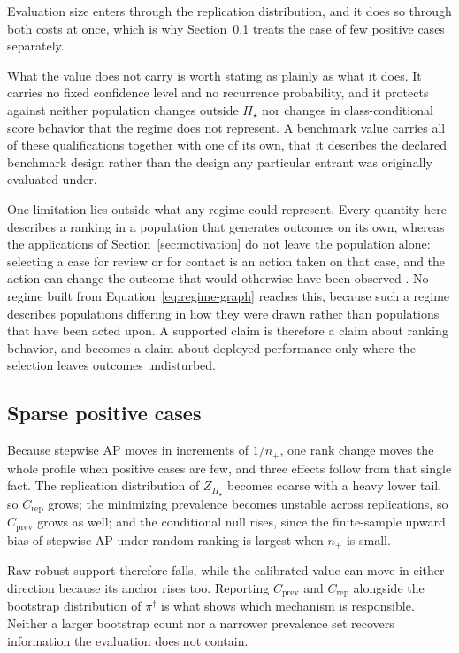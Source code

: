 \documentclass[11pt]{article}
\newcommand{\PSet}{\Pi_\star}
\theoremstyle{remark}
\begin{document}
Evaluation size enters through the replication distribution, and it does so through both costs at once, which is why Section~\ref{sec:sparse} treats the case of few positive cases separately.

What the value does not carry is worth stating as plainly as what it does. It carries no fixed confidence level and no recurrence probability, and it protects against neither population changes outside $\PSet$ nor changes in class-conditional score behavior that the regime does not represent. A benchmark value carries all of these qualifications together with one of its own, that it describes the declared benchmark design rather than the design any particular entrant was originally evaluated under.

One limitation lies outside what any regime could represent. Every quantity here describes a ranking in a population that generates outcomes on its own, whereas the applications of Section~\ref{sec:motivation} do not leave the population alone: selecting a case for review or for contact is an action taken on that case, and the action can change the outcome that would otherwise have been observed \cite{perdomo2020performative}. No regime built from Equation~\eqref{eq:regime-graph} reaches this, because such a regime describes populations differing in how they were drawn rather than populations that have been acted upon. A supported claim is therefore a claim about ranking behavior, and becomes a claim about deployed performance only where the selection leaves outcomes undisturbed.

\subsection{Sparse positive cases}
\label{sec:sparse}

Because stepwise AP moves in increments of $1/n_+$, one rank change moves the whole profile when positive cases are few, and three effects follow from that single fact. The replication distribution of $Z_{\PSet}$ becomes coarse with a heavy lower tail, so $C_{\mathrm{rep}}$ grows; the minimizing prevalence becomes unstable across replications, so $C_{\mathrm{prev}}$ grows as well; and the conditional null rises, since the finite-sample upward bias of stepwise AP under random ranking is largest when $n_+$ is small.

Raw robust support therefore falls, while the calibrated value can move in either direction because its anchor rises too. Reporting $C_{\mathrm{prev}}$ and $C_{\mathrm{rep}}$ alongside the bootstrap distribution of $\pi^\dagger$ is what shows which mechanism is responsible. Neither a larger bootstrap count nor a narrower prevalence set recovers information the evaluation does not contain.
\end{document}

